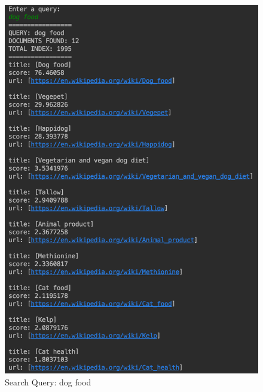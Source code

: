 \documentclass[a4paper]{article}
\begin{document}
\begin{figure}[H]
\begin{minipage}[b]{0.4\textwidth}
    \includegraphics[width=\textwidth]{imgs/dog-food}
    \caption{Search Query: dog food}
    \label{fig:dog-food}
  \end{minipage}
  \hfill
  \begin{minipage}[b]{0.4\textwidth}

\end{minipage}
\end{figure}
\end{document}
